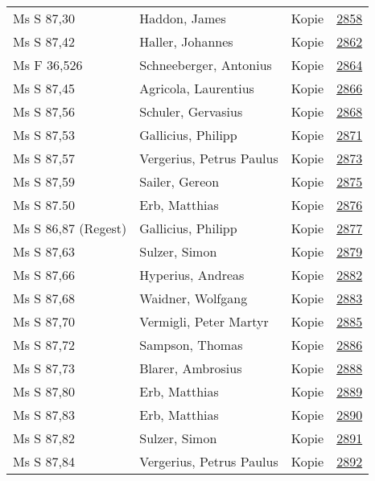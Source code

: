 \documentclass[10pt,a4paper,landscape]{report}
\begin{document}
\begin{longtable}{p{16cm}p{4cm}lr}
Ms S 87,30	&	Haddon, James	&	Kopie	&	\href{http://130.60.24.72/assignment/2858}{2858}\\
Ms S 87,42	&	Haller, Johannes	&	Kopie	&	\href{http://130.60.24.72/assignment/2862}{2862}\\
Ms F 36,526	&	Schneeberger, Antonius	&	Kopie	&	\href{http://130.60.24.72/assignment/2864}{2864}\\
Ms S 87,45	&	Agricola, Laurentius	&	Kopie	&	\href{http://130.60.24.72/assignment/2866}{2866}\\
Ms S 87,56	&	Schuler, Gervasius	&	Kopie	&	\href{http://130.60.24.72/assignment/2868}{2868}\\
Ms S 87,53	&	Gallicius, Philipp	&	Kopie	&	\href{http://130.60.24.72/assignment/2871}{2871}\\
Ms S 87,57	&	Vergerius, Petrus Paulus	&	Kopie	&	\href{http://130.60.24.72/assignment/2873}{2873}\\
Ms S 87,59	&	Sailer, Gereon	&	Kopie	&	\href{http://130.60.24.72/assignment/2875}{2875}\\
Ms S 87.50	&	Erb, Matthias	&	Kopie	&	\href{http://130.60.24.72/assignment/2876}{2876}\\
Ms S 86,87 (Regest)	&	Gallicius, Philipp	&	Kopie	&	\href{http://130.60.24.72/assignment/2877}{2877}\\
Ms S 87,63	&	Sulzer, Simon	&	Kopie	&	\href{http://130.60.24.72/assignment/2879}{2879}\\
Ms S 87,66	&	Hyperius, Andreas	&	Kopie	&	\href{http://130.60.24.72/assignment/2882}{2882}\\
Ms S 87,68	&	Waidner, Wolfgang	&	Kopie	&	\href{http://130.60.24.72/assignment/2883}{2883}\\
Ms S 87,70	&	Vermigli, Peter Martyr	&	Kopie	&	\href{http://130.60.24.72/assignment/2885}{2885}\\
Ms S 87,72	&	Sampson, Thomas	&	Kopie	&	\href{http://130.60.24.72/assignment/2886}{2886}\\
Ms S 87,73	&	Blarer, Ambrosius	&	Kopie	&	\href{http://130.60.24.72/assignment/2888}{2888}\\
Ms S 87,80	&	Erb, Matthias	&	Kopie	&	\href{http://130.60.24.72/assignment/2889}{2889}\\
Ms S 87,83	&	Erb, Matthias	&	Kopie	&	\href{http://130.60.24.72/assignment/2890}{2890}\\
Ms S 87,82	&	Sulzer, Simon	&	Kopie	&	\href{http://130.60.24.72/assignment/2891}{2891}\\
Ms S 87,84	&	Vergerius, Petrus Paulus	&	Kopie	&	\href{http://130.60.24.72/assignment/2892}{2892}\\

\end{longtable}
\end{document}
